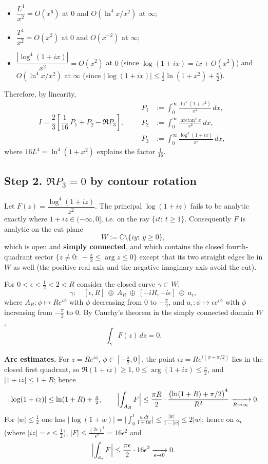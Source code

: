 \documentclass[11pt]{article}
\theoremstyle{remark}
\begin{document}
\begin{itemize}
\item $\dfrac{L^4}{x^2}=O(x^6)$ at $0$ and $O(\ln^4x/x^2)$ at $\infty$;
\item $\dfrac{T^4}{x^2}=O(x^2)$ at $0$ and $O(x^{-2})$ at $\infty$;
\item $\dfrac{|\log^4(1+ix)|}{x^2}=O(x^2)$ at $0$ (since $\log(1+ix)=ix+O(x^2)$) and $O(\ln^4x/x^2)$ at $\infty$ (since $|\log(1+ix)|\le\tfrac12\ln(1+x^2)+\tfrac\pi2$).
\end{itemize}

Therefore, by linearity,
\[
I=\frac23\left[\frac{1}{16}\,P_1+P_2-\Re P_3\right],
\qquad
\begin{aligned}
P_1&:=\int_0^\infty\frac{\ln^4(1+x^2)}{x^2}\,dx,\\
P_2&:=\int_0^\infty\frac{\arctan^4x}{x^2}\,dx,\\
P_3&:=\int_0^\infty\frac{\log^4(1+ix)}{x^2}\,dx ,
\end{aligned}
\]
where $16L^4=\ln^4(1+x^2)$ explains the factor $\tfrac1{16}$.

\subsection*{Step 2. $\Re P_3=0$ by contour rotation}

Let $F(z)=\dfrac{\log^4(1+iz)}{z^2}$. The principal $\log(1+iz)$ fails to be analytic exactly where $1+iz\in(-\infty,0]$, i.e. on the ray $\{it:\ t\ge1\}$. Consequently $F$ is analytic on the cut plane
\[
W:=\mathbb{C}\setminus\{iy:\ y\ge0\},
\]
which is open and \textbf{simply connected}, and which contains the closed fourth-quadrant sector $\{z\ne 0:\ -\tfrac\pi2\le\arg z\le0\}$ except that its two straight edges lie in $W$ as well (the positive real axis and the negative imaginary axis avoid the cut).

For $0<\epsilon<\tfrac12<2<R$ consider the closed curve $\gamma\subset W$:
\[
\gamma:\quad[\epsilon,R]\ \oplus\ A_R\ \oplus\ [-iR,-i\epsilon]\ \oplus\ a_\epsilon,
\]
where $A_R:\phi\mapsto Re^{i\phi}$ with $\phi$ decreasing from $0$ to $-\tfrac\pi2$, and $a_\epsilon:\phi\mapsto\epsilon e^{i\phi}$ with $\phi$ increasing from $-\tfrac\pi2$ to $0$. By Cauchy's theorem in the simply connected domain $W$,
\[
\int_\gamma F(z)\,dz=0 .
\]

\textbf{Arc estimates.} For $z=Re^{i\phi}$, $\phi\in[-\tfrac\pi2,0]$, the point $iz=Re^{i(\phi+\pi/2)}$ lies in the closed first quadrant, so $\Re(1+iz)\ge1$, $0\le\arg(1+iz)\le\tfrac\pi2$, and $|1+iz|\le1+R$; hence
\[
|\log(1+iz)|\le\ln(1+R)+\tfrac\pi2,
\qquad
\Bigl|\int_{A_R}F\Bigr|\le\frac{\pi R}{2}\cdot\frac{\bigl(\ln(1+R)+\pi/2\bigr)^4}{R^2}\xrightarrow[R\to\infty]{}0 .
\]
For $|w|\le\tfrac12$ one has $|\log(1+w)|=\bigl|\int_0^1\frac{w\,dt}{1+tw}\bigr|\le\frac{|w|}{1-|w|}\le2|w|$; hence on $a_\epsilon$ (where $|iz|=\epsilon\le\tfrac12$), $|F|\le\frac{(2\epsilon)^4}{\epsilon^2}=16\epsilon^2$ and
\[
\Bigl|\int_{a_\epsilon}F\Bigr|\le\frac{\pi\epsilon}{2}\cdot16\epsilon^2\xrightarrow[\epsilon\to0]{}0 .
\]
\end{document}
